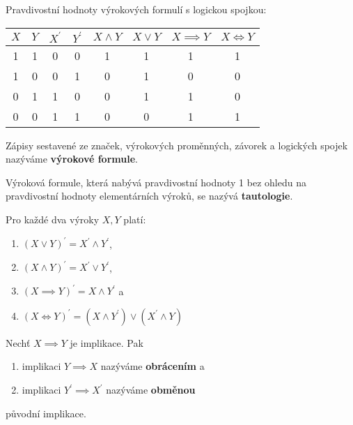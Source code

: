 \begin{pozn}
  Pravdivostní hodnoty výrokových formulí s logickou spojkou:
  \begin{center}
    \begin{tabular}{c c | c c | c c c c}
      $X$ & $Y$ & $X^\prime$ & $Y^\prime$ & $X\land Y$ & $X\lor Y$ & $X\implies Y$ & $X\iff Y$ \\
      \hline
      1 & 1 & 0 & 0 & 1 & 1 & 1 & 1 \\
      1 & 0 & 0 & 1 & 0 & 1 & 0 & 0 \\
      0 & 1 & 1 & 0 & 0 & 1 & 1 & 0 \\
      0 & 0 & 1 & 1 & 0 & 0 & 1 & 1 \\
    \end{tabular}
  \end{center}
\end{pozn}

\begin{definition}
  Zápisy sestavené ze značek, výrokových proměnných, závorek a logických spojek nazýváme \textbf{výrokové formule}.
\end{definition}

\begin{definition}
  Výroková formule, která nabývá pravdivostní hodnoty 1 bez ohledu na pravdivostní hodnoty elementárních výroků, se nazývá \textbf{tautologie}.
\end{definition}

\begin{veta}
  Pro každé dva výroky $X,Y$ platí:
  \begin{enumerate}[$i.$]
    \item $(X\lor Y)^\prime = X^\prime \land Y^\prime$,
    \item $(X\land Y)^\prime = X^\prime \lor Y^\prime$,
    \item $(X\implies Y)^\prime = X\land Y^\prime$ a
    \item $(X\iff Y)^\prime = (X\land Y^\prime) \lor (X^\prime \land Y)$
  \end{enumerate}
\end{veta}

\begin{definition}
  Nechť $X\implies Y$ je implikace. Pak
  \begin{enumerate}[$i.$]
    \item implikaci $Y\implies X$ nazýváme \textbf{obrácením} a
    \item implikaci $Y^\prime \implies X^\prime$ nazýváme \textbf{obměnou}
  \end{enumerate}
  původní implikace.
\end{definition}

